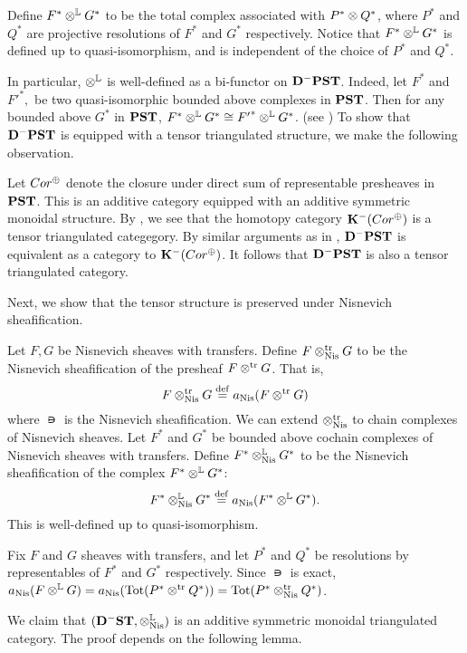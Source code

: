 Define $F^* \tL G^*$ to be the total complex associated with
$P^* \tensor Q^*$, where $P^*$ and $Q^*$ are projective 
resolutions of $F^*$ and $G^*$ respectively. Notice that $F^* \tL 
G^*$ is defined up to quasi-isomorphism, and is independent 
of the choice of $P^*$ and $Q^*$.

In particular, $\tL$ is well-defined as a bi-functor on 
$\DCat[D]^-\PST$. Indeed, let $F^*$ and ${F'}^*,$ be two 
quasi-isomorphic bounded above complexes in $\PST$. Then for any 
bounded above $G^*$ in $\PST$, $F^* \tL G^* \cong {F'}^* \tL G^*$. 
(see \cite[8.7]{MVW}) To show that $\DCat^-\PST$ is equipped
with a tensor triangulated structure, we make the following 
observation.

Let $\Cor^{\oplus}$ denote the closure under direct 
sum of representable presheaves in $\PST$. This is an additive
category equipped with an additive symmetric monoidal structure.
By \cite[8A.4]{MVW}, we see that the homotopy category 
$\DCat[K]^-(\Cor^{\oplus})$ is a tensor triangulated categegory.
By similar arguments as in \cite[10.4.8]{WH}, $\DCat[D]^-\PST$
is equivalent as a category to $\DCat[K]^-(\Cor^{\oplus})$.
It follows that $\DCat[D]^-\PST$ is also a tensor triangulated 
category.

Next, we show that the tensor structure is preserved under
Nisnevich sheafification.

\begin{defn}\label{def_shcor_tensor}
Let $F, G$ be Nisnevich sheaves with transfers. Define
$F \ttrNis G$ to be the Nisnevich sheafification of the presheaf
$F \ttr G$. That is,
\[
F \ttrNis G \defeq \nis(F \ttr G)
\]
where $\nis$ is the Nisnevich sheafification. We can extend 
$\ttrNis$ to chain complexes of Nisnevich sheaves. Let $F^*$ and 
$G^*$ be bounded above cochain complexes of Nisnevich sheaves with transfers. 
Define $F^* \tLNis G^*$ to be the Nisnevich sheafification of the 
complex $F^* \tL G^*$:
\[
F^* \tLNis G^* \defeq \nis(F^* \tL G^*).
\]
This is well-defined up to quasi-isomorphism.
\end{defn}

\begin{rmk}
Fix $F$ and $G$ sheaves with transfers, and let $P^*$ and 
$Q^*$ be resolutions by representables of $F^*$ and $G^*$ 
respectively. Since $\nis$ is exact, $\nis(F \tL G) = 
\nis(\Tot(P^* \ttr Q^*)) = \Tot(P^* \ttrNis Q^*)$.
\end{rmk}

We claim that $(\DShCor, \tLNis)$ is an additive symmetric 
monoidal triangulated category. The proof depends on the following
lemma.

